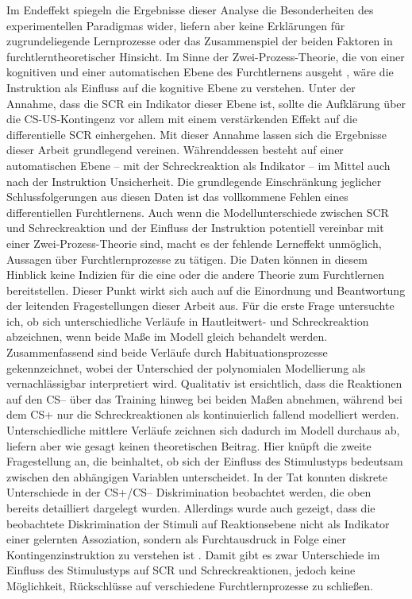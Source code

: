 	
	Im Endeffekt spiegeln die Ergebnisse dieser Analyse die Besonderheiten des experimentellen Paradigmas wider, liefern aber keine Erklärungen für zugrundeliegende Lernprozesse oder das Zusammenspiel der beiden Faktoren in furchtlerntheoretischer Hinsicht. 
	Im Sinne der Zwei-Prozess-Theorie, die von einer kognitiven und einer automatischen Ebene des Furchtlernens ausgeht \parencite[z.\,B.][]{HAMM1996, OEHMANN2001}, wäre die Instruktion als Einfluss auf die kognitive Ebene zu verstehen.
	Unter der Annahme, dass die SCR ein Indikator dieser Ebene ist, sollte die Aufklärung über die CS-US-Kontingenz  vor allem mit einem verstärkenden Effekt auf die differentielle SCR einhergehen. Mit dieser Annahme lassen sich die Ergebnisse dieser Arbeit grundlegend vereinen. Währenddessen besteht auf einer automatischen Ebene -- mit der Schreckreaktion als Indikator --  im Mittel auch nach der Instruktion Unsicherheit. 
	Die grundlegende Einschränkung jeglicher Schlussfolgerungen aus diesen Daten ist das vollkommene Fehlen eines differentiellen Furchtlernens. Auch wenn die Modellunterschiede zwischen SCR und Schreckreaktion und der Einfluss der Instruktion potentiell vereinbar mit einer Zwei-Prozess-Theorie sind, macht es der fehlende Lerneffekt unmöglich, Aussagen über Furchtlernprozesse zu tätigen.
	Die Daten können in diesem Hinblick keine Indizien für die eine oder die andere Theorie zum Furchtlernen bereitstellen.
	Dieser Punkt wirkt sich auch auf die Einordnung und Beantwortung der leitenden Fragestellungen dieser Arbeit aus.
	Für die erste Frage untersuchte ich, ob sich unterschiedliche Verläufe in Hautleitwert- und Schreckreaktion abzeichnen, wenn beide Maße im Modell gleich behandelt werden. Zusammenfassend sind beide Verläufe durch Habituationsprozesse gekennzeichnet, wobei der Unterschied der polynomialen Modellierung als vernachlässigbar interpretiert wird. Qualitativ ist ersichtlich, dass die Reaktionen auf den CS-- über das Training hinweg bei beiden Maßen abnehmen, während bei dem CS+ nur die Schreckreaktionen als kontinuierlich fallend modelliert werden. Unterschiedliche mittlere Verläufe zeichnen sich dadurch im Modell durchaus ab, liefern aber wie gesagt keinen theoretischen Beitrag.
	Hier knüpft die zweite Fragestellung an, die beinhaltet, ob sich der Einfluss des Stimulustyps bedeutsam zwischen den abhängigen Variablen unterscheidet. 
	In der Tat konnten diskrete Unterschiede in der CS+/CS-- Diskrimination beobachtet werden, die oben bereits  detailliert dargelegt wurden. 
	Allerdings wurde auch gezeigt, dass die beobachtete Diskrimination der Stimuli auf Reaktionsebene nicht als Indikator einer gelernten Assoziation, sondern als Furchtausdruck in Folge einer Kontingenzinstruktion zu verstehen ist \parencite{LONSDORF2017fc}. Damit gibt es zwar Unterschiede im Einfluss des Stimulustyps auf SCR und Schreckreaktionen, jedoch keine Möglichkeit, Rückschlüsse auf verschiedene Furchtlernprozesse zu schließen.
	

